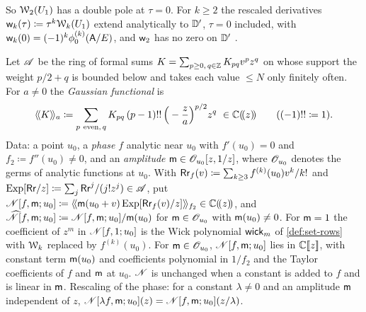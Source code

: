 So $\mathcal{W}_2(U_1)$ has a double pole at $\tau=0$. For $k\geq2$ the rescaled derivatives $\mathsf{w}_k(\tau)\coloneqq\tau^k\mathcal{W}_k(U_1)$ extend analytically to $\mathbb{D}'$, $\tau=0$ included, with $\mathsf{w}_k(0)=(-1)^k\phi_0^{(k)}(\mathsf{A}/E)$, and $\mathsf{w}_2$ has no zero on $\mathbb{D}'$ .

\begin{defn}
\label{def:row-Lnorm}
Let $\mathscr{A}$ be the ring of formal sums $K=\sum_{p\geq0,\,q\in\mathbb{Z}}K_{pq}v^pz^q$ on whose support the weight $p/2+q$ is bounded below and takes each value $\leq N$ only finitely often. For $a\neq0$ the \emph{Gaussian functional} is
\[
\gauss{K}{a}\coloneqq\sum_{p\ \mathrm{even},\,q}K_{pq}\,(p-1)!!\,\Big(-\frac za\Big)^{p/2}z^q\ \in\Cz\qquad((-1)!!\coloneqq1).
\]
Data: a point $u_0$, a \emph{phase} $f$ analytic near $u_0$ with $f'(u_0)=0$ and $f_2\coloneqq f''(u_0)\neq0$, and an \emph{amplitude} $\mathsf{m}\in\mathscr{O}_{u_0}[z,1/z]$, where $\mathscr{O}_{u_0}$ denotes the germs of analytic functions at $u_0$. With $\mathsf{Rr}_f(v)\coloneqq\sum_{k\geq3}f^{(k)}(u_0)v^k/k!$ and $\mathrm{Exp}[\mathsf{Rr}/z]\coloneqq\sum_j\mathsf{Rr}^j/(j!z^j)\in\mathscr{A}$, put $\mathscr{N}[f,\mathsf{m};u_0]\coloneqq\langle\!\langle \mathsf{m}(u_0+v)\,\mathrm{Exp}[\mathsf{Rr}_f(v)/z]\rangle\!\rangle_{f_2}\in\mathbb{C}(\!(z)\!)$, and $\widehat{\mathscr{N}}[f,\mathsf{m};u_0]\coloneqq\mathscr{N}[f,\mathsf{m};u_0]/\mathsf{m}(u_0)$ for $\mathsf{m}\in\mathscr{O}_{u_0}$ with $\mathsf{m}(u_0)\neq0$. For $\mathsf{m}=1$ the coefficient of $z^m$ in $\mathscr{N}[f,1;u_0]$ is the Wick polynomial $\mathsf{wick}_m$ of \cref{def:set-rows} with $\mathcal{W}_k$ replaced by $f^{(k)}(u_0)$. For $\mathsf{m}\in\mathscr{O}_{u_0}$, $\mathscr{N}[f,\mathsf{m};u_0]$ lies in $\mathbb{C}[\![ z ]\!]$, with constant term $\mathsf{m}(u_0)$ and coefficients polynomial in $1/f_2$ and the Taylor coefficients of $f$ and $\mathsf{m}$ at $u_0$. $\mathscr{N}$ is unchanged when a constant is added to $f$ and is linear in $\mathsf{m}$. Rescaling of the phase: for a constant $\lambda\neq0$ and an amplitude $\mathsf{m}$ independent of $z$, $\mathscr{N}[\lambda f,\mathsf{m};u_0](z)=\mathscr{N}[f,\mathsf{m};u_0](z/\lambda)$.
\end{defn}

